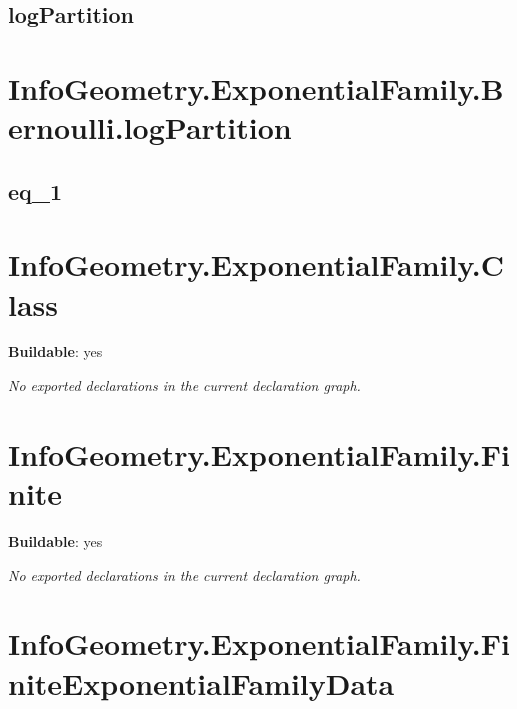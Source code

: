 \begin{theorem}[blueprint="infogeometry:exponentialfamily:bernoulli:instbregmandivergencereal"]
\end{theorem}

\subsection*{logPartition}

\begin{theorem}[blueprint="infogeometry:exponentialfamily:bernoulli:logpartition"]
\end{theorem}

\section{InfoGeometry.ExponentialFamily.Bernoulli.logPartition}

\subsection*{eq_1}

\begin{theorem}[blueprint="infogeometry:exponentialfamily:bernoulli:logpartition:eq_1"]
\end{theorem}

\section{InfoGeometry.ExponentialFamily.Class}

\noindent\textbf{Buildable}: yes

\noindent\emph{No exported declarations in the current declaration graph.}

\section{InfoGeometry.ExponentialFamily.Finite}

\noindent\textbf{Buildable}: yes

\noindent\emph{No exported declarations in the current declaration graph.}

\section{InfoGeometry.ExponentialFamily.FiniteExponentialFamilyData}

